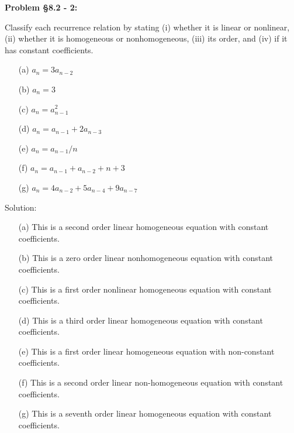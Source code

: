 \documentclass{article}
\newenvironment{problem}[1]
    {\begin{mdframed}[default]
    \textbf{Problem #1:}
    }
    {\end{mdframed}
    }
\begin{document}
\begin{problem}{\S 8.2 - 2}
Classify each recurrence relation by stating (i) whether it is linear or nonlinear, (ii) whether it is homogeneous or nonhomogeneous, (iii) its order, and (iv) if it has constant coefficients.
\begin{itemize}
    \item[(a)] $a_n = 3a_{n-2}$
    \item[(b)] $a_n = 3$
    \item[(c)] $a_n = a_{n-1}^2$
    \item[(d)] $a_n = a_{n-1} + 2a_{n-3}$
    \item[(e)] $a_n = a_{n-1}/n$
    \item[(f)] $a_n = a_{n-1} + a_{n-2} + n + 3$
    \item[(g)] $a_n = 4a_{n-2} + 5a_{n-4} + 9a_{n-7}$
\end{itemize}

Solution:
\begin{itemize}
    \item [(a)] This is a second order linear homogeneous equation with constant coefficients.
    \item [(b)] This is a zero order linear nonhomogeneous equation with constant coefficients.
    \item [(c)] This is a first order nonlinear homogeneous equation with constant coefficients.
    \item [(d)] This is a third order linear homogeneous equation with constant coefficients.
    \item [(e)] This is a first order linear homogeneous equation with non-constant coefficients.
    \item [(f)] This is a second order linear non-homogeneous equation with constant coefficients.
    \item [(g)] This is a seventh order linear homogeneous equation with constant coefficients.
\end{itemize}
\end{problem}
\end{document}
